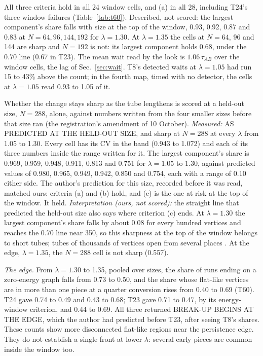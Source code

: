 \documentclass[aps,pre,10pt,twocolumn,superscriptaddress,nofootinbib]{revtex4-2}
\begin{document}
All three criteria hold in all 24 window cells, and (a) in all 28, including T24's three window failures
(Table~\ref{tab:t60}). Described, not scored: the largest component's share falls with size at the top of the
window, 0.93, 0.92, 0.87 and 0.83 at $N=64,96,144,192$ for $\lambda=1.30$. At $\lambda=1.35$ the cells at
$N=64$, 96 and 144 are sharp and $N=192$ is not: its largest component holds 0.68, under the 0.70 line (0.67 in
T23). The mean wait read by the look is $1.06\,\tau_{AB}$ over the window cells, the lag of
Sec.~\ref{sec:wait}. T8's detected waits at $\lambda=1.05$ had run 15 to 43\% above the count; in the fourth map, timed
with no detector, the cells at $\lambda=1.05$ read 0.93 to 1.05 of it.

Whether the change stays sharp as the tube lengthens is scored at a held-out size, $N=288$, alone, against
numbers written from the four smaller sizes before that size ran (the registration's amendment of 10 October).
\emph{Measured:} AS PREDICTED AT THE HELD-OUT SIZE, and sharp at $N=288$ at every $\lambda$ from 1.05
to 1.30. Every cell has its CV in the band (0.943 to 1.072) and each of its three numbers inside the range written
for it. The largest component's share is 0.969, 0.959, 0.948, 0.911, 0.813 and 0.751 for $\lambda=1.05$ to 1.30,
against predicted values of 0.980, 0.965, 0.949, 0.942, 0.850 and 0.754, each with a range of 0.10 either side. The
author's prediction for this size, recorded before it was read, matched ours: criteria (a) and (b) hold, and (c) is the
one at risk at the top of the window. It held. \emph{Interpretation (ours, not scored):} the straight line that
predicted the held-out size also says where criterion (c) ends. At $\lambda=1.30$ the largest component's share
falls by about 0.08 for every hundred vertices and reaches the 0.70 line near 350, so this sharpness at the top of
the window belongs to short tubes; tubes of thousands of vertices open from several places \cite{paper2}. At the
edge, $\lambda=1.35$, the $N=288$ cell is not sharp (0.557).

\emph{The edge.} From $\lambda=1.30$ to 1.35, pooled over sizes, the share of runs ending on a zero-energy graph
falls from 0.73 to 0.50, and the share whose flat-like vertices are in more than one piece at a quarter
conversion rises from 0.40 to 0.69 (T60). T24 gave 0.74 to 0.49 and 0.43 to 0.68; T23 gave 0.71 to 0.47, by its
energy-window criterion, and 0.44 to 0.69. All three returned BREAK-UP BEGINS AT THE EDGE, which the author had
predicted before T23, after seeing T8's shares. These counts show more disconnected flat-like regions near the
persistence edge. They do not establish a single front at lower $\lambda$: several early pieces are common inside
the window too.
\end{document}
